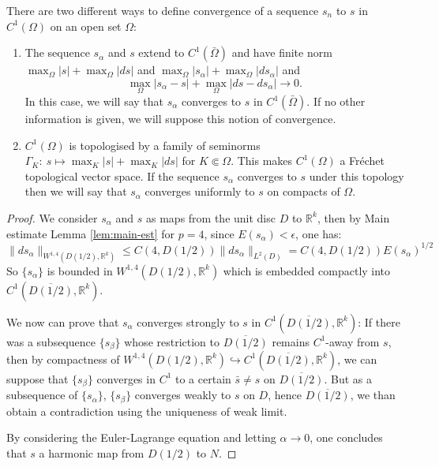 \begin{remark}
\label{rem:topo-C1}
There are two different ways to define convergence of a sequence \(s_n\) to \(s\) in
\(C^1(\Omega)\) on an open set \(\Omega\):
\begin{enumerate}
\item The sequence \(s_\alpha\) and \(s\) extend to \(C^1(\bar\Omega)\) and have finite norm \(\max_\Omega |s| +
   \max_\Omega|ds|\) and \(\max_\Omega |s_\alpha| + \max_\Omega|ds_\alpha|\) and
\[
     \max_\Omega |s_\alpha - s| + \max_\Omega |ds-ds_\alpha| \to 0.
   \]
In this case, we will say that \(s_\alpha\) converges to \(s\) in \(C^1(\bar\Omega)\). If no other information is given, we will suppose this notion of convergence.
\item \(C^1(\Omega)\) is topologised by a family of seminorms
\(\Gamma_K:\ s\longmapsto \max_{K} |s| + \max_{K}|ds|\)
for \(K\Subset\Omega\). This makes \(C^1(\Omega)\) a Fréchet topological vector space.
If the sequence \(s_\alpha\) converges to \(s\) under this topology then we will
say that \(s_\alpha\) converges uniformly to \(s\) on compacts of \(\Omega\).
\end{enumerate}
\end{remark}

\begin{proof}
We consider \(s_\alpha\) and \(s\) as maps from the unit disc \(D\) to \(\mathbb{R}^k\), then by Main estimate Lemma \ref{lem:main-est} for \(p=4\), since \(E(s_\alpha) < \epsilon\), one has:
\[
\|ds_\alpha\|_{W^{1,4}(D(1/2), \mathbb{R}^k)} \leq C(4, D(1/2)) \| ds_\alpha\|_{L^2(D)} =
C(4, D(1/2)) E(s_\alpha)^{1/2}
\]
So \(\{s_\alpha\}\) is bounded in \(W^{1,4}(D(1/2), \mathbb{R}^k)\) which is embedded
compactly into \(C^1(\overline{D(1/2)}, \mathbb{R}^k)\).

We now can prove that \(s_\alpha\) converges strongly to \(s\) in \(C^1(\overline{D(1/2)},\mathbb{R}^k)\): If there was a subsequence \(\{s_\beta\}\)
whose restriction to \(\overline{D(1/2)}\) remains \(C^1\)-away from \(s\), then by compactness of \(W^{1,4}(D(1/2),
\mathbb{R}^k) \hookrightarrow C^1(\overline{D(1/2)}, \mathbb{R}^k)\), we can suppose that \(\{s_\beta\}\) converges in \(C^1\) to a certain \(\bar s\ne s\) on \(\overline{D(1/2)}\). But as a
subsequence of \(\{s_\alpha\}\), \(\{s_\beta\}\) converges weakly to \(s\) on \(D\), hence \(\overline{D(1/2)}\), we than obtain a contradiction using the uniqueness of
weak limit.

By considering the Euler-Lagrange equation and letting \(\alpha\to 0\), one concludes
that \(s\) a harmonic map from \(D(1/2)\) to \(N\).
\end{proof}


